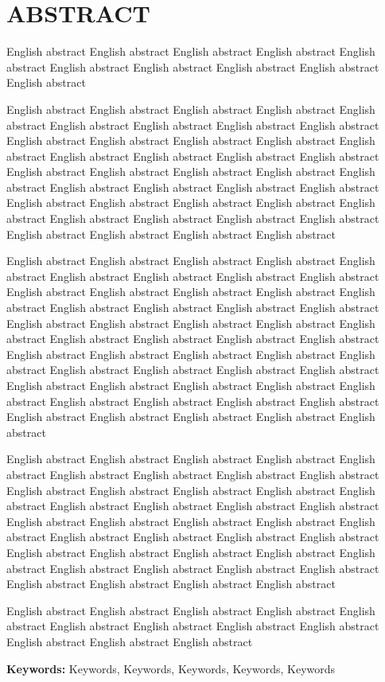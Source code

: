 \chapter*{\setmainfont{Times New Roman}\bfseries ABSTRACT}
{
\setmainfont{Times New Roman}

English abstract English abstract English abstract English abstract English abstract English abstract English abstract English abstract English abstract English abstract 

English abstract English abstract English abstract English abstract English abstract English abstract English abstract English abstract English abstract English abstract English abstract English abstract English abstract English abstract English abstract English abstract English abstract English abstract English abstract English abstract English abstract English abstract English abstract English abstract English abstract English abstract English abstract English abstract English abstract English abstract English abstract English abstract English abstract English abstract English abstract English abstract English abstract English abstract English abstract English abstract 

English abstract English abstract English abstract English abstract English abstract English abstract English abstract English abstract English abstract English abstract English abstract English abstract English abstract English abstract English abstract English abstract English abstract English abstract English abstract English abstract English abstract English abstract English abstract English abstract English abstract English abstract English abstract English abstract English abstract English abstract English abstract English abstract English abstract English abstract English abstract English abstract English abstract English abstract English abstract English abstract English abstract English abstract English abstract English abstract English abstract English abstract English abstract English abstract English abstract English abstract 

English abstract English abstract English abstract English abstract English abstract English abstract English abstract English abstract English abstract English abstract English abstract English abstract English abstract English abstract English abstract English abstract English abstract English abstract English abstract English abstract English abstract English abstract English abstract English abstract English abstract English abstract English abstract English abstract English abstract English abstract English abstract English abstract English abstract English abstract English abstract English abstract English abstract English abstract English abstract English abstract 

English abstract English abstract English abstract English abstract English abstract English abstract English abstract English abstract English abstract English abstract English abstract English abstract 

}
\vspace*{2.5cm}
{\noindent\bfseries Keywords:}
Keywords, Keywords, Keywords, Keywords, Keywords


